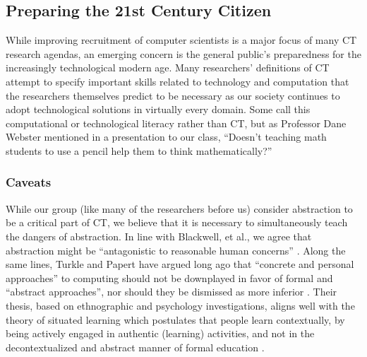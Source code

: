\documentclass{acm_proc_article-sp}
\begin{document}
\subsection{Preparing the 21st Century Citizen}
\label{sec:citizens}
While improving recruitment of computer scientists is a major focus of many CT research agendas, an emerging concern is the general public's preparedness for the increasingly technological modern age. Many researchers' definitions of CT attempt to specify important skills related to technology and computation that the researchers themselves predict to be necessary as our society continues to adopt technological solutions in virtually every domain. Some call this computational or technological literacy rather than CT, but as Professor Dane Webster mentioned in a presentation to our class, ``Doesn't teaching math students to use a pencil help them to think mathematically?''\cite{webster2013quote}

\subsubsection{Caveats}
\label{sec:caveats}
While our group (like many of the researchers before us) consider abstraction to be a critical part of CT, we believe that it is necessary to simultaneously teach the dangers of abstraction.
In line with Blackwell, et al., we agree that abstraction might be ``antagonistic to reasonable human concerns'' \cite{blackwell2008abstract}.
Along the same lines, Turkle and Papert have argued long ago that ``concrete and personal approaches'' to computing should not be downplayed in favor of formal and ``abstract approaches'', nor should they be dismissed as more inferior \cite{turkle1990epistemological}.
Their thesis, based on ethnographic and psychology investigations, aligns well with the theory of situated learning which postulates that people learn contextually, by being actively engaged in authentic (learning) activities, and not in the decontextualized and abstract manner of formal education \cite{brown1989situated}.


\end{document}
